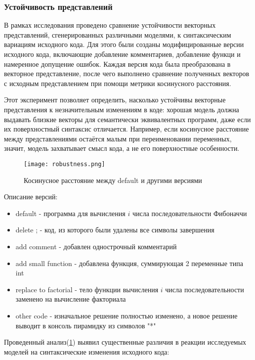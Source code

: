 \documentclass[../part_3.tex]{subfiles}
\begin{document}
\subsubsection{Устойчивость представлений}
\par В рамках исследования проведено сравнение устойчивости векторных представлений, сгенерированных различными моделями, к синтаксическим вариациям исходного кода. Для этого были созданы модифицированные версии исходного кода, включающие добавление комментариев, добавление функци и намеренное допущение ошибок. Каждая версия кода была преобразована в векторное представление, после чего выполнено сравнение полученных векторов с исходным представлением при помощи метрики косинусного расстояния.
\par Этот эксперимент позволяет определить, насколько устойчивы векторные представления к незначительным изменениям в коде: хорошая модель должна выдавать близкие векторы для семантически эквивалентных программ, даже если их поверхностный синтаксис отличается. Например, если косинусное расстояние между представлениями остаётся малым при переименовании переменных, значит, модель захватывает смысл кода, а не его поверхностные особенности.
\begin{figure}[H]
    \centering
    \texttt{[image: robustness.png]}
    \caption{Косинусное расстояние между default и другими версиями}
    \label{fig:robustness}
\end{figure}
\par Описание версий:
\begin{itemize}
    \item default - программа для вычисления $i$ числа последовательности Фибоначчи
    \item delete ; - код, из которого были удалены все символы завершения
    \item add comment - добавлен однострочный комментарий
    \item add small function - добавлена функция, суммирующая 2 переменные типа int
    \item replace to factorial - тело функции вычисления $i$ числа последовательности заменено на вычисление факториала
    \item other code - изначальное решение полностью изменено, а новое решение выводит в консоль пирамидку из символов "*"
\end{itemize}
\par Проведенный анализ(\ref{fig:robustness}) выявил существенные различия в реакции исследуемых моделей на синтаксические изменения исходного кода:
\end{document}
